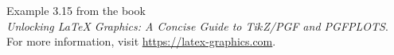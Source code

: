 \documentclass{article}
\begin{document}
Example 3.15 from the book\\
\emph{Unlocking LaTeX Graphics: A Concise Guide to Ti$k$Z/PGF and PGFPLOTS}.\\
For more information, visit \url{https://latex-graphics.com}.
\par\bigskip

\end{document}
